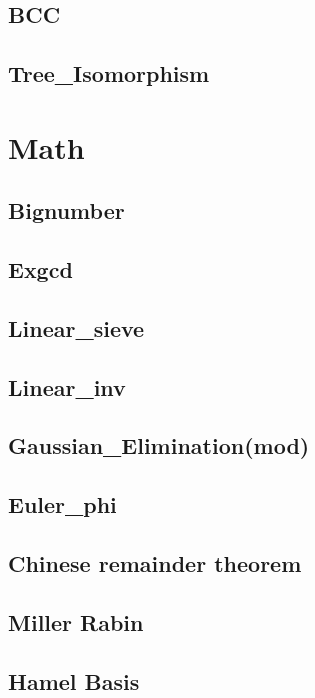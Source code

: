     \subsection{BCC}
        
    \subsection{Tree\_Isomorphism}
        

\section{Math}
    \subsection{Bignumber}
        
    \subsection{Exgcd}
        
    \subsection{Linear\_sieve}
        
    \subsection{Linear\_inv}
        
    \subsection{Gaussian\_Elimination(mod)}
        
    \subsection{Euler\_phi}
        
    \subsection{Chinese remainder theorem}
        
    \subsection{Miller Rabin}
        
    \subsection{Hamel Basis}
        

